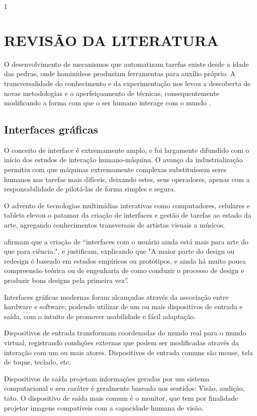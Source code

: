 1\chapter{REVISÃO DA LITERATURA}

O desenvolvimento de mecanismos que automatizam tarefas existe desde a idade das
pedras, onde hominídeos produziam ferramentas para auxílio próprio. A
transversalidade do conhecimento e da experimentação nos levou a descoberta de
novas metodologias e o aperfeiçoamento de técnicas, consequentemente modificando
a forma com que o ser humano interage com o mundo
\cite[p. 1]{sartori2010neurociencia}.

\section{Interfaces gráficas}

O conceito de interface é extremamente amplo, e foi largamente difundido com o
início dos estudos de interação humano-máquina. O avanço da industrialização
permitiu com que máquinas extremamente complexas substituíssem seres humanos nas
tarefas mais difíceis, deixando estes, seus operadores, apenas com a
responsabilidade de pilotá-las de forma simples e segura.

O advento de tecnologias multimídias interativas como computadores, celulares e
tablets elevou o patamar da criação de interfaces e gestão de tarefas ao estado
da arte, agregando conhecimentos transversais de artistas visuais a músicos.

 afirmam que a criação de “interfaces
com o usuário ainda está mais para arte do que para ciência.", e justificam,
explicando que "A maior parte do design ou redesign é baseado em estudos
empíricos ou protótipos, e ainda há muito pouca compreensão teórica ou de
engenharia de como conduzir o processo de design e produzir bons designs pela
primeira vez”.

Interfaces gráficas modernas foram alcançadas através da associação entre
hardware e software, podendo utilizar de um ou mais dispositivos de entrada e
saída, com o intuito de promover usabilidade e fácil adaptação.

Dispositivos de entrada transformam coordenadas do mundo real para o mundo
virtual, registrando condições externas que podem ser modificadas através da
interação com um ou mais atores. Dispositivos de entrada comuns são mouse, tela
de toque, teclado, etc.

Dispositivos de saída projetam informações geradas por um sistema computacional
e seu caráter é geralmente baseado nos sentidos: Visão, audição, tato. O
dispositivo de saída mais comum é o monitor, que tem por finalidade projetar
imagens compatíveis com a capacidade humana de visão.

